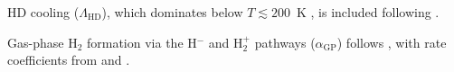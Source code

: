 
HD cooling ($\Lambda_\mathrm{HD}$), which dominates below
$T \lesssim 200$~K , is included following
\citet{Flower_2000} .



Gas-phase H$_2$ formation via the H$^{-}$ and H$_2^+$ pathways
($\alpha_\mathrm{GP}$) follows \citet{Glover_Jappsen_2007},
with rate coefficients from \citet{Abel_1997} and
\citet{Galli_Palla_1998}.



